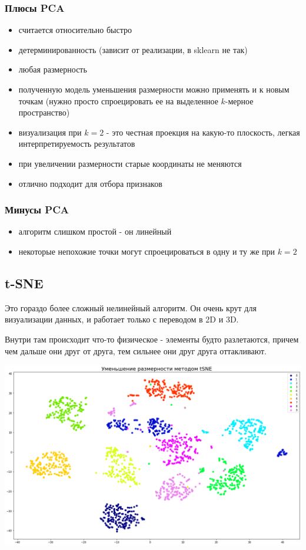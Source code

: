 \subsubsection*{Плюсы PCA}
\begin{itemize}
    \item считается относительно быстро
    \item детерминированность (зависит от реализации, в sklearn не так)
    \item любая размерность
    \item полученную модель уменьшения размерности можно применять и к новым точкам (нужно просто спроецировать ее на выделенное $k$-мерное пространство)
    \item визуализация при $k = 2$ - это честная проекция на какую-то плоскость, легкая интерпретируемость результатов
    \item при увеличении размерности старые координаты не меняются
    \item отлично подходит для отбора признаков
\end{itemize}

\subsubsection*{Минусы PCA}
\begin{itemize}
    \item алгоритм слишком простой - он линейный
    \item некоторые непохожие точки могут спроецироваться в одну и ту же при $k = 2$
\end{itemize}

\subsection{t-SNE}
Это гораздо более сложный нелинейный алгоритм. Он очень крут для визуализации данных, и работает только с переводом в 2D и 3D.

Внутри там происходит что-то физическое - элементы будто разлетаются, причем чем дальше они друг от друга, тем сильнее они друг друга оттакливают.

\begin{center}
    \includegraphics[scale=0.45]{tickets/pictures/tsne_sample.png}
\end{center}

